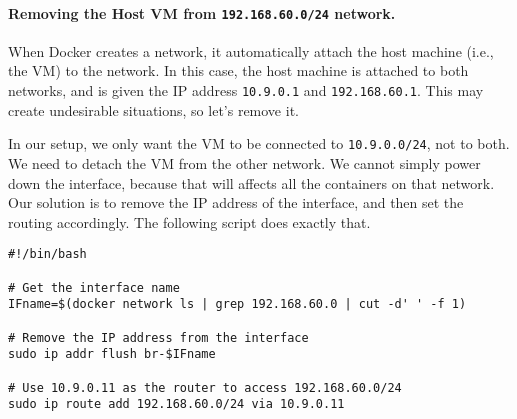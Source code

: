 
\paragraph{Removing the Host VM from \texttt{192.168.60.0/24} network.}
When Docker creates a network, it automatically attach the
host machine (i.e., the VM) to the network. In this
case, the host machine is attached to both
networks, and is given the IP address \texttt{10.9.0.1} and
\texttt{192.168.60.1}.
This may create undesirable situations,
so let's remove it.

In our setup, we only want the VM to be connected to
\texttt{10.9.0.0/24}, not to both.
We need to detach the VM from the other network. We cannot simply power down
the interface, because that will affects all the containers on that network.
Our solution is to remove the IP address
of the interface, and then set the routing accordingly. The following
script does exactly that.


\begin{lstlisting}
#!/bin/bash

# Get the interface name
IFname=$(docker network ls | grep 192.168.60.0 | cut -d' ' -f 1)

# Remove the IP address from the interface
sudo ip addr flush br-$IFname

# Use 10.9.0.11 as the router to access 192.168.60.0/24
sudo ip route add 192.168.60.0/24 via 10.9.0.11
\end{lstlisting}

